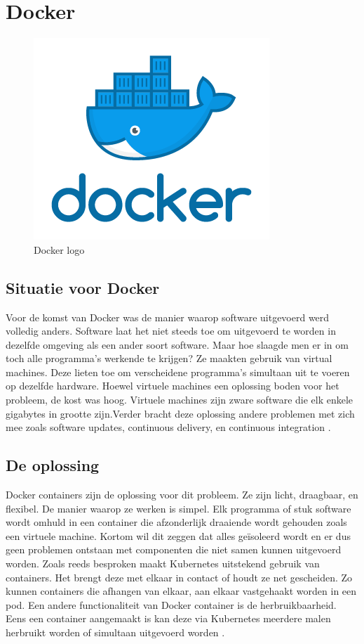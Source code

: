 \section{Docker}
\label{sec:docker}

\begin{figure}[ht]
    \centering
   \includegraphics[scale=0.4]{img/docker_logo}
    \caption[Docker logo]{Docker logo \cite{docker}}
\end{figure}

\subsection{Situatie voor Docker}
Voor de komst van Docker was de manier waarop software uitgevoerd werd volledig anders. Software laat het niet steeds toe om uitgevoerd te worden in dezelfde omgeving als een ander soort software. Maar hoe slaagde men er in om toch alle programma's werkende te krijgen? Ze maakten gebruik van virtual machines. Deze lieten toe om verscheidene programma's simultaan uit te voeren op dezelfde hardware. Hoewel virtuele machines een oplossing boden voor het probleem, de kost was hoog. Virtuele machines zijn zware software die elk enkele gigabytes in grootte zijn.Verder bracht deze oplossing andere problemen met zich mee  zoals software updates, continuous delivery, en continuous integration \autocite{yegulalp2018}.

\subsection{De oplossing}
Docker containers zijn de oplossing voor dit probleem. Ze zijn licht, draagbaar, en flexibel. De manier waarop ze werken is simpel. Elk programma of stuk software wordt omhuld in een container die afzonderlijk draaiende wordt gehouden zoals een virtuele machine. Kortom wil dit zeggen dat alles geïsoleerd wordt en er dus geen problemen ontstaan met componenten die niet samen kunnen uitgevoerd worden. Zoals reeds besproken maakt Kubernetes uitstekend gebruik van containers. Het brengt deze met elkaar in contact of houdt ze net gescheiden. Zo kunnen containers die afhangen van elkaar, aan elkaar vastgehaakt worden in een pod. Een andere functionaliteit van Docker container is de herbruikbaarheid. Eens een container aangemaakt is kan deze via Kubernetes meerdere malen herbruikt worden of simultaan uitgevoerd worden \autocite{yegulalp2018}.

